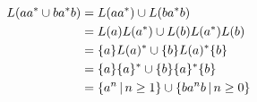 \begin{align*}
 L(aa^* \cup ba^*b)
  &= L(aa^*) \cup L(ba^*b) \cr
  &= L(a)L(a^*) \cup L(b)L(a^*)L(b) \cr
  &= \{a\}L(a)^* \cup \{b\}L(a)^*\{b\} \cr
  &= \{a\}\{a\}^* \cup \{b\}\{a\}^*\{b\} \cr
  &= \{ a^n \,|\, n \geq 1 \} \cup \{ ba^nb \,|\, n \geq 0 \}
 \end{align*}
